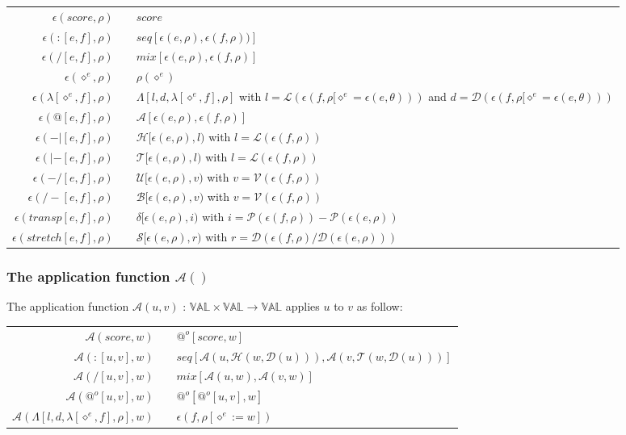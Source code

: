 \documentclass[10pt,a4paper,frenchb]{article}
\makeatletter
\newcommand{\seq}{:}
\newcommand{\var}[1]{\diamond^#1}
\newcommand{\val}{\mathbb{VAL}}
\newcommand{\closure}{\Lambda}
\newcommand{\noredex}{@^o}
\newcommand{\f}[3]{$#1 \times #2 \rightarrow #3$}
\newcommand{\evalsym}{\epsilon}
\newcommand{\eval}[1]{\evalsym(#1,\rho)}
\newcommand{\envsym}{\rho}
\newcommand{\emptyenv}{\theta}
\newcommand{\closenv}[4][\var{e}]{\closure[#3,#4,\lambda[#1,#2],\envsym]}
\newcommand{\apply}	{{\mathcal A}}
\newcommand{\length}	{{\mathcal L}}
\newcommand{\voices}	{{\mathcal V}}
\newcommand{\pitch}	{{\mathcal P}}
\newcommand{\dur}		{{\mathcal D}}
\newcommand{\head}		{{\mathcal H}}
\newcommand{\tail}		{{\mathcal T}}
\renewcommand{\top}	{{\mathcal U}}
\newcommand{\bottom}	{{\mathcal B}}
\newcommand{\transp}	{\delta}
\renewcommand{\stretch}{{\mathcal S}}
\makeatother
\begin{document}
\begin{center}
\begin{tabular}{rc@{ $\rightarrow$ }l}
 \hline
 $\eval{score}$				& & $score$ \\
 $\eval{\seq [e,f] }$			& & $seq[\eval{e}, \eval{f})]$ \\
 $\eval{/ [e,f]}$ 			& & $mix[\eval{e}, \eval{f}]$ \\
 $\eval{\var{e}}$ 				& & $\envsym(\var{e})$ \\
 $\eval{\lambda[\var{e},f]}$ 	& & $\closenv{f}{l}{d}$ with $l=\length(\evalsym(f,\envsym[\var{e}= \evalsym(e, \emptyenv)))$ and $d=\dur(\evalsym(f,\envsym[\var{e}= \evalsym(e, \emptyenv)))$\\
 $\eval{@[e,f]}$ 				& & $\apply [\eval{e}, \eval{f}]$ \\
 $\eval{-| [e,f]}$ 			 & & $\head [\eval{e},l)$ with $l = \length(\eval{f})$ \\
 $\eval{|- [e,f]}$ 			 & & $\tail [\eval{e},l)$ with $l = \length(\eval{f})$ \\
 $\eval{-/ [e,f]}$ 			 & & $\top [\eval{e},v)$ with $v = \voices(\eval{f})$ \\
 $\eval{/- [e,f]}$ 			 & & $\bottom [\eval{e},v)$ with $v = \voices(\eval{f})$ \\
 $\eval{transp[e,f]}$ 		& & $\transp [\eval{e},i)$ with $i = \pitch(\eval{f}) - \pitch(\eval{e}) $ \\
 $\eval{stretch[e,f]}$ 		& & $\stretch [\eval{e},r)$ with $r = \dur(\eval{f} / \dur(\eval{e}))$ \\
 \hline
\end{tabular}
\end{center}


\subsubsection{The application function $\apply()$}
The application function $\apply(u,v)$ : \f{\val}{\val}{\val} applies $u$ to $v$ as follow:

\begin{center}
\begin{tabular}{rc@{ $\rightarrow$ }l}
 \hline
 $\apply(score,w)$				& & $\noredex[score,w]$ \\
 $\apply(\seq [u,v],w)$		& & $seq[\apply(u,\head(w,\dur(u))), \apply(v,\tail(w,\dur(u)))]$ \\
 $\apply(/ [u,v],w)$ 			& & $mix[\apply(u,w),\apply(v,w)]$ \\
 $\apply(\noredex [u,v],w)$ 	& & $\noredex[\noredex[u,v],w]$ \\
 $\apply(\closenv{f}{l}{d},w)$ 		& & $\evalsym(f,\envsym[\var{e} := w])$ \\
 \hline
\end{tabular}
\end{center}
\end{document}
